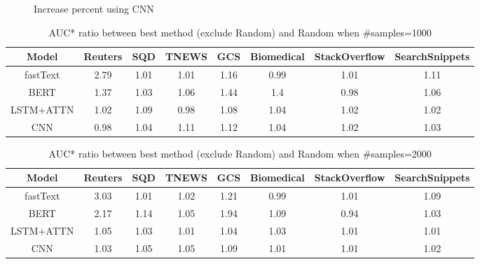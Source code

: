 \begin{figure}[th!]
\begin{center}
	\end{center}
	\noindent
	\begin{center}
	\end{center}
	\caption{Increase percent using CNN}
	\label{fig:auc_increase_cnn}
\end{figure}

\begin{table}[th]
	\scriptsize
	\centering
	\begin{tabular}{cccccccc}
		\toprule
		Model & Reuters    & SQD   & TNEWS   & GCS& Biomedical & StackOverflow & SearchSnippets\\ \hline
		fastText & 2.79 & 1.01 & 1.01 & 1.16 & 0.99 & 1.01 & 1.11 \\
		BERT & 1.37 & 1.03 & 1.06 & 1.44 & 1.4 & 0.98 & 1.06 \\
		LSTM+ATTN & 1.02 & 1.09 & 0.98 & 1.08 & 1.04 & 1.02 & 1.02 \\
		CNN & 0.98 & 1.04 & 1.11 & 1.12 & 1.04 & 1.02 & 1.03 \\
		
		\bottomrule
	\end{tabular}
	\caption{AUC* ratio between best method (exclude Random) and Random when \#samples=1000}
	\label{table:auc_ratio_1000}
\end{table}

\begin{table}[th]
	\scriptsize
	\centering
	\begin{tabular}{cccccccc}
		\toprule
		Model & Reuters    & SQD   & TNEWS   & GCS& Biomedical & StackOverflow & SearchSnippets\\ \hline
		fastText & 3.03 & 1.01 & 1.02 & 1.21 & 0.99 & 1.01 & 1.09 \\
		BERT & 2.17 & 1.14 & 1.05 & 1.94 & 1.09 & 0.94 & 1.03 \\
		LSTM+ATTN & 1.05 & 1.03 & 1.01 & 1.04 & 1.03 & 1.01 & 1.01 \\
		CNN & 1.03 & 1.05 & 1.05 & 1.09 & 1.01 & 1.01 & 1.02 \\
		
		\bottomrule
	\end{tabular}
	\caption{AUC* ratio between best method (exclude Random) and Random when \#samples=2000}
	\label{table:auc_ratio_2000}
\end{table}

